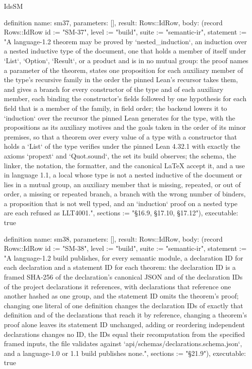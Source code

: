 \begin{lexlean}{IdsSM}
\begin{semanticmodule}
definition{
  name: sm37,
  parameters: [],
  result: Rows::IdRow,
  body: (record Rows::IdRow {id := "SM-37", level := "build", suite := "semantic-ir", statement := "A language-1.2 theorem may be proved by `nested_induction`, an induction over a nested inductive type of the document, one that holds a member of itself under `List`, `Option`, `Result`, or a product and is in no mutual group: the proof names a parameter of the theorem, states one proposition for each auxiliary member of the type's recursive family in the order the pinned Lean's recursor takes them, and gives a branch for every constructor of the type and of each auxiliary member, each binding the constructor's fields followed by one hypothesis for each field that is a member of the family, in field order; the backend lowers it to `induction` over the recursor the pinned Lean generates for the type, with the propositions as its auxiliary motives and the goals taken in the order of its minor premises, so that a theorem over every value of a type with a constructor that holds a `List` of the type verifies under the pinned Lean 4.32.1 with exactly the axioms `propext` and `Quot.sound`, the set its build observes; the schema, the linker, the notation, the formatter, and the canonical LaTeX accept it, and a use in language 1.1, a local whose type is not a nested inductive of the document or lies in a mutual group, an auxiliary member that is missing, repeated, or out of order, a missing or repeated branch, a branch with the wrong number of binders, a proposition that is not well typed, and an `induction` proof on a nested type are each refused as LLT4001.", sections := "§16.9, §17.10, §17.12"}),
  executable: true
}

definition{
  name: sm38,
  parameters: [],
  result: Rows::IdRow,
  body: (record Rows::IdRow {id := "SM-38", level := "build", suite := "semantic-ir", statement := "A language-1.2 build publishes, for every semantic module, a declaration ID for each declaration and a statement ID for each theorem: the declaration ID is a framed SHA-256 of the declaration's canonical JSON and of the declaration IDs of the project declarations it references, with declarations that reference one another hashed as one group, and the statement ID omits the theorem's proof; changing one literal of one definition changes the declaration IDs of exactly that definition and of the declarations that reach it by reference, changing a theorem's proof alone leaves its statement ID unchanged, adding or reordering independent declarations changes no ID, the IDs equal their recomputation from the specified framed inputs, the file validates against `api/schemas/declarations.schema.json`, and a language-1.0 or 1.1 build publishes none.", sections := "§21.9"}),
  executable: true
}


\end{semanticmodule}
\end{lexlean}
